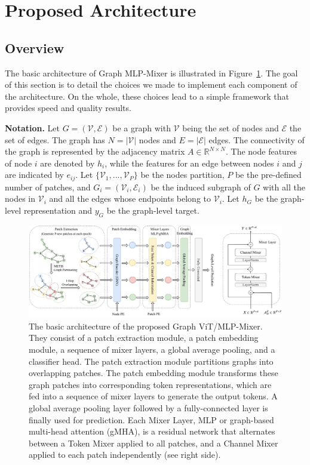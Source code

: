 \documentclass{article}
\begin{document}
\section{Proposed Architecture}\label{sec: archi}

\subsection{Overview}\label{sec: overview}

The basic architecture of Graph MLP-Mixer is illustrated in Figure~\ref{fig: overview}. The goal of this section is to detail the choices we made to implement each component of the architecture. On the whole, these choices lead to a simple framework that provides speed and quality results.

\textbf{Notation.}  Let $G=(\mathcal{V}, \mathcal{E})$ be a graph with $\mathcal{V}$ being the set of nodes and $\mathcal{E}$ the set of edges. The graph has $N=|\mathcal{V}|$ nodes and $E = |\mathcal{E}|$ edges. The connectivity of the graph is represented by the adjacency matrix $A\in \mathbb{R}^{N \times N}$. The node features of node $i$ are denoted by $h_i$, while the features for an edge between nodes $i$ and $j$ are indicated by $e_{ij}$.  Let $\{\mathcal{V}_1, ..., \mathcal{V}_P\}$ be the nodes partition, $P$ be the pre-defined number of patches, and $G_i = (\mathcal{V}_i, \mathcal{E}_i)$ be the induced subgraph of $G$ with all the nodes in $\mathcal{V}_i$ and all the edges whose endpoints belong to $\mathcal{V}_i$. Let $h_G$ be the graph-level representation and $y_G$ be the graph-level target.

\begin{figure}[t]
    \centering
    \includegraphics[width=1.0\textwidth]{figs/overview_v7.pdf}
    \caption{
    The basic architecture of the proposed Graph ViT/MLP-Mixer. They consist of a patch extraction module, a patch embedding module, a sequence of mixer layers, a global average pooling, and a classifier head. The patch extraction module partitions graphs into overlapping patches. The patch embedding module transforms these graph patches into corresponding token representations, which are fed into a sequence of mixer layers to generate the output tokens. A global average pooling layer followed by a fully-connected layer is finally used for prediction. Each Mixer Layer, MLP or graph-based multi-head attention (gMHA), is a residual network that alternates between a Token Mixer applied to all patches, and a Channel Mixer applied to each patch independently (see right side).
    }
    \label{fig: overview}
\end{figure}
\end{document}

